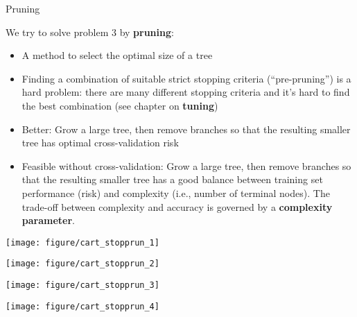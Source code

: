 \begin{vbframe}{Pruning}

We try to solve problem 3 by \textbf{pruning}:

\begin{itemize}
\item A method to select the optimal size of a tree
\item Finding a combination of suitable strict stopping criteria (\enquote{pre-pruning}) is a hard problem: there are many different stopping criteria and it's hard to find the best combination (see chapter on \textbf{tuning})
\item Better: Grow a large tree, then remove branches so that the resulting smaller tree has optimal cross-validation risk
\item Feasible without cross-validation: Grow a large tree, then remove branches so that the resulting smaller tree has a good balance between training set performance (risk) and complexity (i.e., number of terminal nodes). The trade-off between complexity and accuracy is governed by a \textbf{complexity parameter}.
\end{itemize}

\framebreak



\framebreak

\begin{knitrout}\scriptsize
{}\color{fgcolor}

{\centering \texttt{[image: figure/cart\_stopprun\_1]} 

}




{\centering \texttt{[image: figure/cart\_stopprun\_2]} 

}




{\centering \texttt{[image: figure/cart\_stopprun\_3]} 

}




{\centering \texttt{[image: figure/cart\_stopprun\_4]} 

}



\end{knitrout}
\end{vbframe}



\endlecture

